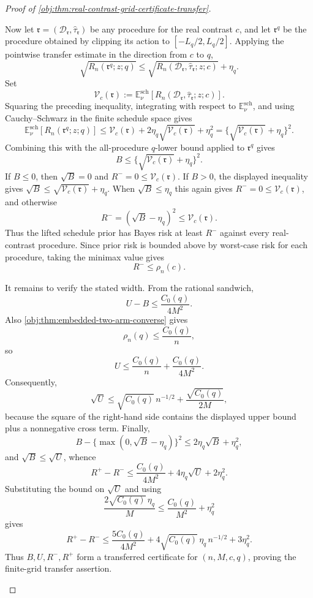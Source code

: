 \begin{proof}[Proof of \cref{obj:thm:real-contrast-grid-certificate-transfer}]
\begin{enumerate}
Now let \(\mathfrak r=(\mathcal D_{\mathfrak r},\widehat\tau_{\mathfrak r})\) be any procedure for the real contrast \(c\), and let \(\mathfrak r^{q}\) be the procedure obtained by clipping its action to \([-L_q/2,L_q/2]\).  Applying the pointwise transfer estimate in the direction from \(c\) to \(q\),
\[
\sqrt{R_n(\mathfrak r^{q};z;q)}
\le
\sqrt{R_n(\mathcal D_{\mathfrak r},\widehat\tau_{\mathfrak r};z;c)}+\eta_q .
\]
Set
\[
\mathscr V_c(\mathfrak r)
:=
\mathbb E^{\mathrm{sch}}_{\nu}
\left[R_n(\mathcal D_{\mathfrak r},\widehat\tau_{\mathfrak r};z;c)\right].
\]
Squaring the preceding inequality, integrating with respect to \(\mathbb E^{\mathrm{sch}}_{\nu}\), and using Cauchy--Schwarz in the finite schedule space gives
\[
\mathbb E^{\mathrm{sch}}_{\nu}
\left[R_n(\mathfrak r^{q};z;q)\right]
\le
\mathscr V_c(\mathfrak r)
+2\eta_q\sqrt{\mathscr V_c(\mathfrak r)}
+\eta_q^2
=
\{\sqrt{\mathscr V_c(\mathfrak r)}+\eta_q\}^2.
\]
Combining this with the all-procedure \(q\)-lower bound applied to \(\mathfrak r^q\) gives
\[
B\le\{\sqrt{\mathscr V_c(\mathfrak r)}+\eta_q\}^2.
\]
If \(B\le0\), then \(\sqrt B=0\) and \(R^-=0\le \mathscr V_c(\mathfrak r)\).  If \(B>0\), the displayed inequality gives \(\sqrt B\le\sqrt{\mathscr V_c(\mathfrak r)}+\eta_q\).  When \(\sqrt B\le\eta_q\) this again gives \(R^-=0\le\mathscr V_c(\mathfrak r)\), and otherwise
\[
R^-=(\sqrt B-\eta_q)^2\le \mathscr V_c(\mathfrak r).
\]
Thus the lifted schedule prior has Bayes risk at least \(R^-\) against every real-contrast procedure.  Since prior risk is bounded above by worst-case risk for each procedure, taking the minimax value gives
\[
R^-\le \rho_n(c).
\]

It remains to verify the stated width.  From the rational sandwich,
\[
U-B\le \frac{C_0(q)}{4M^2}.
\]
Also \cref{obj:thm:embedded-two-arm-converse} gives
\[
\rho_n(q)\le \frac{C_0(q)}{n},
\]
so
\[
U\le \frac{C_0(q)}{n}+\frac{C_0(q)}{4M^2}.
\]
Consequently,
\[
\sqrt U
\le
\sqrt{C_0(q)}\,n^{-1/2}
+
\frac{\sqrt{C_0(q)}}{2M},
\]
because the square of the right-hand side contains the displayed upper bound plus a nonnegative cross term.  Finally,
\[
B-\{\max(0,\sqrt B-\eta_q)\}^2
\le
2\eta_q\sqrt B+\eta_q^2,
\]
and \(\sqrt B\le\sqrt U\), whence
\[
R^+-R^-
\le
\frac{C_0(q)}{4M^2}+4\eta_q\sqrt U+2\eta_q^2.
\]
Substituting the bound on \(\sqrt U\) and using
\[
\frac{2\sqrt{C_0(q)}\,\eta_q}{M}
\le
\frac{C_0(q)}{M^2}+\eta_q^2
\]
gives
\[
R^+-R^-\le
\frac{5C_0(q)}{4M^2}
+4\sqrt{C_0(q)}\,\eta_q\,n^{-1/2}
+3\eta_q^2.
\]
Thus \(B,U,R^-,R^+\) form a transferred certificate for \((n,M,c,q)\), proving the finite-grid transfer assertion. %


\end{enumerate}
\end{proof}
